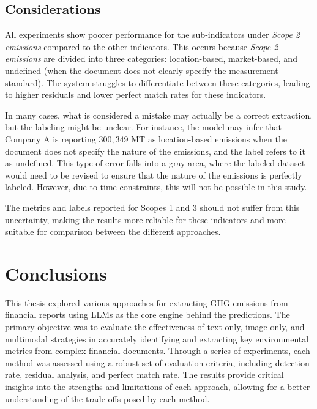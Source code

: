 \documentclass[english, 12pt, a4paper, elec, utf8, a-2b, online]{aaltothesis}
\begin{document}
\subsection{Considerations}

All experiments show poorer performance for the sub-indicators under \textit{Scope 2 emissions} compared to the other indicators.
This occurs because \textit{Scope 2 emissions} are divided into three categories: location-based, market-based, and undefined (when the document does not clearly specify the measurement standard).
The system struggles to differentiate between these categories, leading to higher residuals and lower perfect match rates for these indicators.

In many cases, what is considered a mistake may actually be a correct extraction, but the labeling might be unclear.
For instance, the model may infer that Company A is reporting $300,349$ MT  as location-based emissions when the document does not specify the nature of the emissions, and the label refers to it as undefined.
This type of error falls into a gray area, where the labeled dataset would need to be revised to ensure that the nature of the emissions is perfectly labeled.
However, due to time constraints, this will not be possible in this study.

The metrics and labels reported for Scopes 1 and 3 should not suffer from this uncertainty, making the results more reliable for these indicators and more suitable for comparison between the different approaches.

\clearpage

\section{Conclusions}
\label{sec:summary}

This thesis explored various approaches for extracting \ac{GHG} emissions from financial reports using \acp{LLM} as the core engine behind the predictions.
The primary objective was to evaluate the effectiveness of text-only, image-only, and multimodal strategies in accurately identifying and extracting key environmental metrics from complex financial documents.
Through a series of experiments, each method was assessed using a robust set of evaluation criteria, including detection rate, residual analysis, and perfect match rate.
The results provide critical insights into the strengths and limitations of each approach, allowing for a better understanding of the trade-offs posed by each method.
\end{document}
